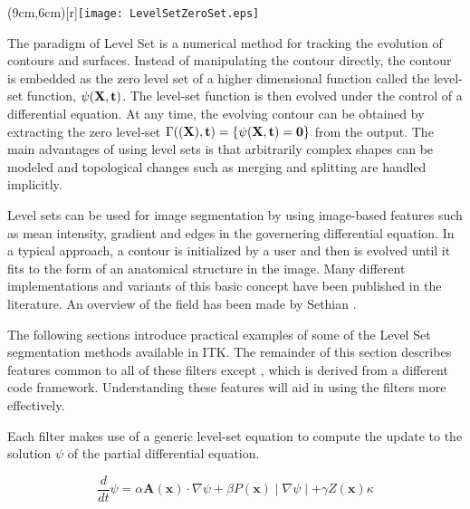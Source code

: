 %
%
% 
%
%
%



\parpic(9cm,6cm)[r]{\texttt{[image: LevelSetZeroSet.eps]}}

The paradigm of Level Set is a numerical method for tracking the evolution of
contours and surfaces. Instead of manipulating the contour directly, the
contour is embedded as the zero level set of a higher dimensional function
called the level-set function, $\psi(\bf{X},t)$. The level-set function is then
evolved under the control of a differential equation.  At any time, the evolving
contour can be obtained by extracting the zero level-set $\Gamma(\bf(X),t) =
\{\psi(\bf{X},t) = 0\}$ from the output.  The main advantages of using level
sets is that arbitrarily complex shapes can be modeled and topological
changes such as merging and splitting are handled implicitly. 

Level sets can be used for image segmentation by using image-based features such
as mean intensity, gradient and edges in the governering differential equation. 
In a typical approach, a contour is initialized by a user and then is evolved 
until it fits to the form of an anatomical structure in the image. 
Many different implementations and variants of this basic concept have been
published in the literature. An overview of the field has been made by Sethian
\cite{Sethian1996}. 

The following sections introduce practical examples of some
of the Level Set segmentation methods available in ITK.  The remainder of this
section describes features common to all of these filters except
, which is derived from a different code
framework.  Understanding these features will aid in using the filters
more effectively.

Each filter makes use of a generic level-set equation to compute the update to
the solution $\psi$ of the partial differential equation.

\begin{equation}
\label{eqn:LevelSetEquation}
\frac{d}{dt}\psi = \alpha \mathbf{A}(\mathbf{x})\cdot\nabla\psi + \beta
  P(\mathbf{x})\mid\nabla\psi\mid + \gamma Z(\mathbf{x})\kappa
\end{equation}
 
